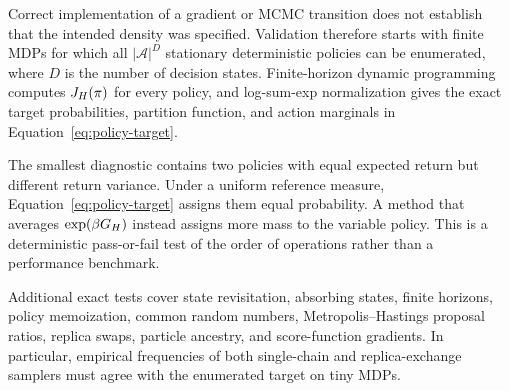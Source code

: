 \label{sec:validation}

Correct implementation of a gradient or MCMC transition does not establish that the
intended density was specified.  Validation therefore starts with finite MDPs
for which all \(|\mathcal A|^D\) stationary deterministic policies can be
enumerated, where \(D\) is the number of decision states.  Finite-horizon
dynamic programming computes \(J_H(\pi)\) for every policy,
and log-sum-exp normalization gives the exact target probabilities, partition
function, and action marginals in Equation~\eqref{eq:policy-target}.


The smallest diagnostic contains two policies with equal expected return but
different return variance.  Under a uniform reference measure,
Equation~\eqref{eq:policy-target} assigns them equal probability.  A method
that averages \(\exp(\beta G_H)\) instead assigns more mass to the
variable policy.  This is a deterministic pass-or-fail test of the order of
operations rather than a performance benchmark.

Additional exact tests cover state revisitation, absorbing states, finite
horizons, policy memoization, common random numbers, Metropolis--Hastings
proposal ratios, replica swaps, particle ancestry, and score-function
gradients.  In particular, empirical frequencies of both single-chain and
replica-exchange samplers must agree with the enumerated target on tiny MDPs.


